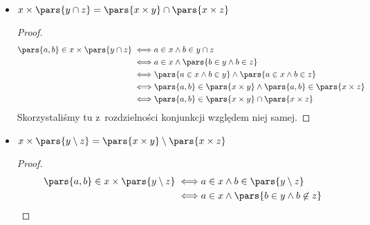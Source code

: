 \begin{itemize}
\begin{proof}
\begin{equation*}
\begin{split}
                        \iff& \xi \in \pars{x \times y} \lor \xi \in \pars{x \times z}\\
                        \iff& \xi \in \pars{x \times y} \cup \pars{x \times z}
                \end{split}
            \end{equation*}
            Skorzystaliśmy tutaj z~rozdzielności konjunkcji względem alternatywy oraz z~faktu, że
            \begin{equation*}
                \exists_v\pars{\varphi \lor \psi} \iff \pars{\exists_v\varphi} \lor \pars{\exists_v\psi}
            \end{equation*}
        \end{proof}
    \item \(x \times \pars{y \cap z} = \pars{x \times y} \cap \pars{x \times z}\)
        \begin{proof}
            \begin{equation*}
                \begin{split}
                    \pars{a, b} \in x \times \pars{y \cap z}
                        \iff& a \in x \land b \in y \cap z\\
                        \iff& a \in x \land \pars{b \in y \land b \in z}\\
                        \iff& \pars{a \in x \land b \in y} \land \pars{a \in x \land b \in z}\\
                        \iff& \pars{a, b} \in \pars{x \times y} \land \pars{a, b} \in \pars{x \times z}\\
                        \iff& \pars{a, b} \in \pars{x \times y} \cap \pars{x \times z}
                \end{split}
            \end{equation*}
            Skorzystaliśmy tu z~rozdzielności konjunkcji względem niej samej.
        \end{proof}
    \item \(x \times \pars{y \setminus z} = \pars{x \times y} \setminus \pars{x \times z}\)
        \begin{proof}
            \begin{equation*}
                \begin{split}
                    \pars{a, b} \in x \times \pars{y \setminus z}
                        \iff& a \in x \land b \in \pars{y \setminus z}\\
                        \iff& a \in x \land \pars{b \in y \land b \not\in z}\\

\end{split}
\end{equation*}
\end{proof}
\end{itemize}
